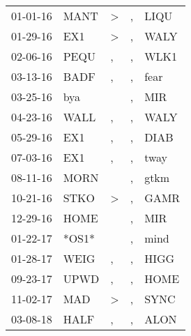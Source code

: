\begin{supertabular}{p{0.07\textwidth}p{0.06\textwidth}p{0.02\textwidth}p{0.02\textwidth}p{0.06\textwidth}}
 01-01-16\textsuperscript{} &  MANT\textsuperscript{} &  \textgreater &  , &  LIQU\textsuperscript{} \\
 01-29-16\textsuperscript{} &   EX1\textsuperscript{} &  \textgreater &  , &  WALY\textsuperscript{} \\
 02-06-16\textsuperscript{} &  PEQU\textsuperscript{} &             , &  , &  WLK1\textsuperscript{} \\
 03-13-16\textsuperscript{} &  BADF\textsuperscript{} &             , &  , &  fear\textsuperscript{} \\
 03-25-16\textsuperscript{} &   bya\textsuperscript{} &               &  , &   MIR\textsuperscript{} \\
 04-23-16\textsuperscript{} &  WALL\textsuperscript{} &             , &  , &  WALY\textsuperscript{} \\
 05-29-16\textsuperscript{} &   EX1\textsuperscript{} &             , &  , &  DIAB\textsuperscript{} \\
 07-03-16\textsuperscript{} &   EX1\textsuperscript{} &             , &  , &  tway\textsuperscript{} \\
 08-11-16\textsuperscript{} &  MORN\textsuperscript{} &               &  , &  gtkm\textsuperscript{} \\
 10-21-16\textsuperscript{} &  STKO\textsuperscript{} &  \textgreater &  , &  GAMR\textsuperscript{} \\
 12-29-16\textsuperscript{} &  HOME\textsuperscript{} &               &  , &   MIR\textsuperscript{} \\
 01-22-17\textsuperscript{} &                   *OS1* &               &  , &  mind\textsuperscript{} \\
 01-28-17\textsuperscript{} &  WEIG\textsuperscript{} &             , &  , &  HIGG\textsuperscript{} \\
 09-23-17\textsuperscript{} &  UPWD\textsuperscript{} &             , &  , &  HOME\textsuperscript{} \\
 11-02-17\textsuperscript{} &   MAD\textsuperscript{} &  \textgreater &  , &  SYNC\textsuperscript{} \\
 03-08-18\textsuperscript{} &  HALF\textsuperscript{} &             , &  , &  ALON\textsuperscript{} \\
\end{supertabular}
